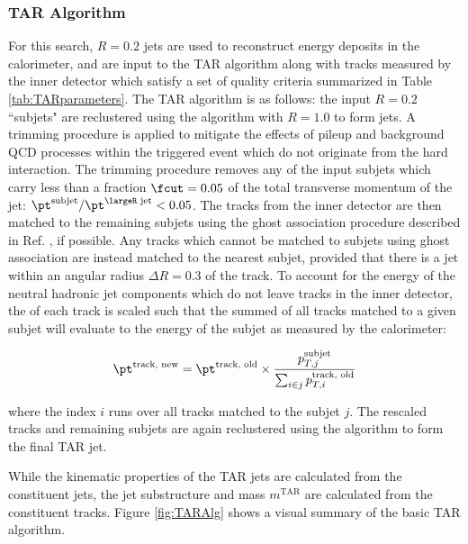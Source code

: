 \subsubsection{TAR Algorithm}
\label{sec:TAR_algo}

For this search, \(R=0.2\) \smallR jets are used to reconstruct energy deposits in the calorimeter, and are input to the TAR algorithm along with tracks measured by the inner detector which satisfy a set of quality criteria summarized in Table \ref{tab:TARparameters}. The TAR algorithm \cite{ATL-PHYS-PUB-2018-012} is as follows: the input \(R=0.2\) \smallR ``subjets" are reclustered using the \akt algorithm with \(R=1.0\) to form \largeR jets. A trimming procedure is applied to mitigate the effects of pileup and background QCD processes within the triggered event which do not originate from the hard interaction. The trimming procedure removes any of the input subjets which carry less than a fraction \(\fcut=0.05\) of the total transverse momentum of the \largeR jet: \(\pt^\text{subjet}/\pt^\text{\largeR jet} < 0.05\).  The tracks from the inner detector are then matched to the remaining \smallR subjets using the ghost association procedure described in Ref. \cite{ghost_association_2008}, if possible. Any tracks which cannot be matched to subjets using ghost association are instead matched to the nearest subjet, provided that there is a jet within an angular radius \(\Delta R=0.3\) of the track. To account for the energy of the neutral hadronic jet components which do not leave tracks in the inner detector, the \pt of each track is scaled such that the summed \pt of all tracks matched to a given subjet will evaluate to the energy of the subjet as measured by the calorimeter:

\begin{equation}
\label{eq:tar_track_pt_scaling}
\pt^\text{track, new} = \pt^\text{track, old} \times \frac{p_{T,j}^\text{subjet}}{\sum_{i \in j}p_{T, i}^\text{track, old}}
\end{equation}

\noindent where the index \(i\) runs over all tracks matched to the subjet \(j\). The rescaled tracks and remaining subjets are again reclustered using the \akt algorithm to form the final \largeR TAR jet.

While the kinematic properties of the TAR jets are calculated from the constituent \smallR jets, the jet substructure and mass \(m^\text{TAR}\) are calculated from the constituent tracks. Figure \ref{fig:TARAlg} shows a visual summary of the basic TAR algorithm. 

